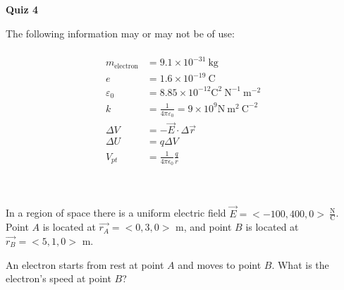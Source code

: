 \documentclass{article}
\begin{document}
\fancyfoot[C]{\thepage}
\vspace*{0cm}
\begin{center}
	{\LARGE \textbf{Quiz 4}}\\
	\vspace{0.25cm}
	\vspace{0.25cm}
\end{center}
The following information may or may not be of use:\\
\hrulefill\\
\begin{align*}
	m_\mathrm{electron}&=9.1\times10^{-31}\ \mathrm{kg}\\
	e&=1.6\times10^{-19}\ \mathrm{C}\\
	\varepsilon_0 &= 8.85\times10^{-12} \mathrm{C}^2\ \mathrm{N}^{-1}\ \mathrm{m}^{-2}\\
	k&=\frac{1}{4\pi\varepsilon_0}=9\times10^9 \mathrm{N}\ \mathrm{m}^2\ \mathrm{C}^{-2}\\
	\Delta V&=-\vec{E}\cdot\Delta\vec{r}\\
	\Delta U &= q\Delta V\\
	V_{pt}&=\frac{1}{4\pi\epsilon_0}\frac{q}{r}
\end{align*}

\hrulefill \\
\\
In a region of space there is a uniform electric field $\vec{E}=<-100, 400, 0>\ \frac{\mathrm{N}}{\mathrm{C}}$. Point $A$ is located at $\vec{r_A}=<0,3,0>$ m, and point $B$ is located at $\vec{r_B}=<5,1,0>$ m.

An electron starts from rest at point $A$ and moves to point $B$. What is the electron's speed at point $B$?
\end{document}
